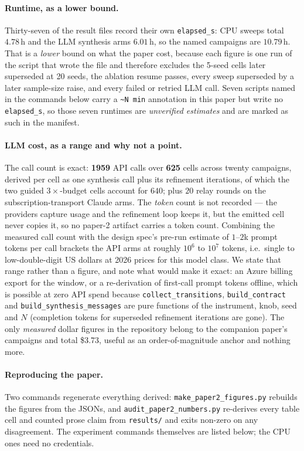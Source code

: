 \paragraph{Runtime, as a lower bound.} Thirty-seven of the result files record their own
\texttt{elapsed\_s}: CPU sweeps total $4.78$\,h and the LLM synthesis arms $6.01$\,h, so the
named campaigns are $10.79$\,h. That is a \emph{lower} bound on what the paper cost, because
each figure is one run of the script that wrote the file and therefore excludes the 5-seed
cells later superseded at 20 seeds, the ablation resume passes, every sweep superseded by a
later sample-size raise, and every failed or retried LLM call. Seven scripts named in the
commands below carry a \texttt{\~{}N min} annotation in this paper but write no
\texttt{elapsed\_s}, so those seven runtimes are \emph{unverified estimates} and are marked
as such in the manifest.

\paragraph{LLM cost, as a range and why not a point.} The call count is exact:
\textbf{1959} API calls over \textbf{625} cells across twenty campaigns, derived per cell as
one synthesis call plus its refinement iterations, of which the two guided
$3\times$-budget cells account for $640$; plus $20$ relay rounds on the
subscription-transport Claude arms. The \emph{token} count is not recorded --- the providers
capture usage and the refinement loop keeps it, but the emitted cell never copies it, so no
paper-2 artifact carries a token count. Combining the measured call count with the design
spec's pre-run estimate of $1$--$2$k prompt tokens per call brackets the API arms at roughly
$10^6$ to $10^7$ tokens, i.e.\ single to low-double-digit US dollars at 2026 prices for this
model class. We state that range rather than a figure, and note what would make it exact: an
Azure billing export for the window, or a re-derivation of first-call prompt tokens offline,
which is possible at zero API spend because \texttt{collect\_\allowbreak transitions},
\texttt{build\_contract} and \texttt{build\_\allowbreak synthesis\_\allowbreak messages} are pure functions of the
instrument, knob, seed and $N$ (completion tokens for superseded refinement iterations are
gone). The only \emph{measured} dollar figures in the repository belong to the companion
paper's campaigns and total \$3.73, useful as an order-of-magnitude anchor and nothing more.

\paragraph{Reproducing the paper.} Two commands regenerate everything derived:
\texttt{make\_\allowbreak paper2\_\allowbreak figures.\allowbreak py} rebuilds the figures from the JSONs, and
\texttt{audit\_\allowbreak paper2\_\allowbreak numbers.\allowbreak py} re-derives every table cell and counted prose claim from
\texttt{results/} and exits non-zero on any disagreement. The experiment commands themselves
are listed below; the CPU ones need no credentials.
